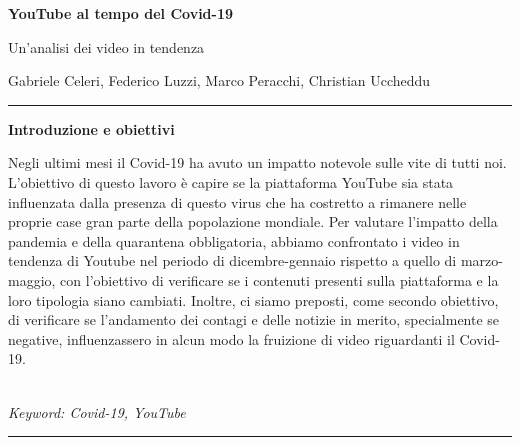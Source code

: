 \documentclass[10pt, a4paper,openany]{article}
\begin{document}
\begin{center}
\huge\textbf{YouTube al tempo del Covid-19}

Un'analisi dei video in tendenza
\end{center}

\begin{center}
Gabriele Celeri, Federico Luzzi,  Marco Peracchi, Christian Uccheddu
\end{center}

\hrule
\vspace{0.2cm}
\begin{center}\textbf{Introduzione e obiettivi}\end{center} 
Negli ultimi mesi il Covid-19 ha avuto un impatto notevole sulle vite di tutti noi. L'obiettivo di questo lavoro è capire se la piattaforma YouTube sia stata influenzata dalla presenza di questo virus che ha costretto a rimanere nelle proprie case gran parte della popolazione mondiale. 
Per valutare l'impatto della pandemia e della quarantena obbligatoria, abbiamo confrontato i video in tendenza di Youtube nel periodo di dicembre-gennaio rispetto a quello di marzo-maggio, con l'obiettivo di verificare se i contenuti presenti sulla piattaforma e la loro tipologia siano cambiati.
Inoltre, ci siamo preposti, come secondo obiettivo, di verificare se l'andamento dei contagi e delle notizie in merito, specialmente se negative, influenzassero in alcun modo la fruizione di video riguardanti il Covid-19.
\\\\ \begin{small}
	\textit{Keyword: Covid-19, YouTube}
\end{small}
\vspace{0.2cm}
\hrule



  
\end{document}
